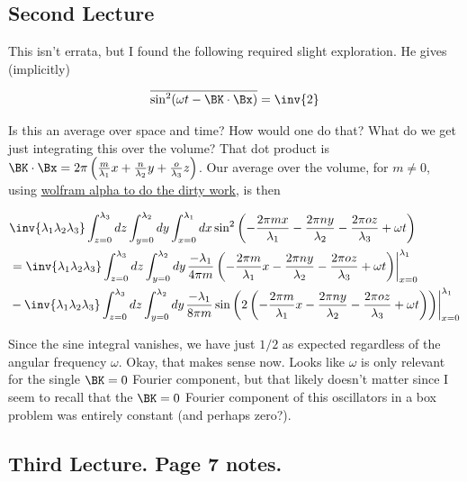 \subsection{Second Lecture}

This isn't errata, but I found the following required slight exploration.  He gives (implicitly)

\begin{align*}
\overline{\sin^2(\omega t - \BK \cdot \Bx)} = \inv{2}
\end{align*}

Is this an average over space and time?  How would one do that?  What do we get just integrating this over the volume?  That dot product is $\BK \cdot \Bx = 2 \pi \left(\frac{m}{\lambda_1} x + \frac{n}{\lambda_2} y + \frac{o}{\lambda_3} z \right)$.  Our average over the volume, for $m \ne 0$, using \href{http://www.wolframalpha.com/input/?i=\int+sin^2(a+x+%2B+b)+dx}{wolfram alpha to do the dirty work}, is then

\begin{align*}
&\inv{\lambda_1 \lambda_2 \lambda_3} 
\int_{z=0}^{\lambda_3} dz
\int_{y=0}^{\lambda_2} dy
\int_{x=0}^{\lambda_1}
dx \sin^2 \left( 
-\frac{2 \pi m x}{\lambda_1} 
-\frac{2 \pi n y}{\lambda_2} 
-\frac{2 \pi o z}{\lambda_3} 
+ \omega t \right) \\
&=
\inv{\lambda_1 \lambda_2 \lambda_3} 
\int_{z=0}^{\lambda_3} dz
\int_{y=0}^{\lambda_2} dy
{\left.
\frac{-\lambda_1}{4 \pi m} \left( 
-\frac{2 \pi m }{\lambda_1} x 
-\frac{2 \pi n y}{\lambda_2} 
-\frac{2 \pi o z}{\lambda_3} 
+ \omega t \right)
\right\vert}_{x=0}^{\lambda_1} \\
&-
\inv{\lambda_1 \lambda_2 \lambda_3} 
\int_{z=0}^{\lambda_3} dz
\int_{y=0}^{\lambda_2} dy
{\left.
\frac{-\lambda_1}{8 \pi m} 
\sin \left( 2 \left(
-\frac{2 \pi m }{\lambda_1} x 
-\frac{2 \pi n y}{\lambda_2} 
-\frac{2 \pi o z}{\lambda_3} 
+ \omega t \right) \right)
\right\vert}_{x=0}^{\lambda_1}
\end{align*}

Since the sine integral vanishes, we have just $1/2$ as expected regardless of the angular frequency $\omega$.  Okay, that makes sense now.  Looks like $\omega$ is only relevant for the single $\BK = 0$ Fourier component, but that likely doesn't matter since I seem to recall that the $\BK = 0$ Fourier component of this oscillators in a box problem was entirely constant (and perhaps zero?).

\subsection{Third Lecture.  Page 7 notes.}

